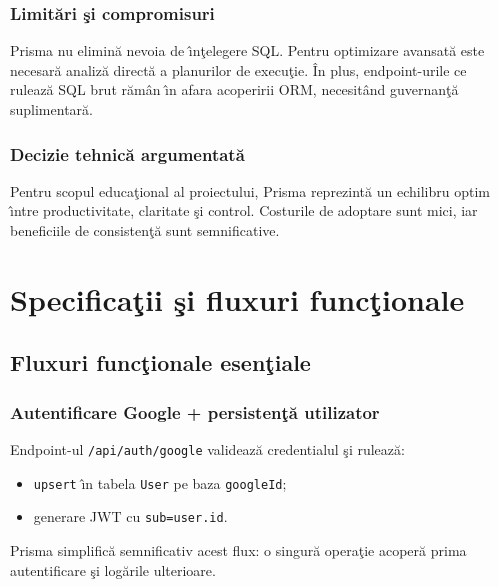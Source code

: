 \documentclass[12pt,onecolumn,draftclsnofoot]{IEEEtran}
\begin{document}
\subsubsection{Limit\u{a}ri \c{s}i compromisuri}
Prisma nu elimin\u{a} nevoia de \^{\i}n\c{t}elegere SQL. Pentru optimizare avansat\u{a} este necesar\u{a} analiz\u{a} direct\u{a} a planurilor de execu\c{t}ie. \^{I}n plus, endpoint-urile ce ruleaz\u{a} SQL brut r\u{a}m\^{a}n \^{\i}n afara acoperirii ORM, necesit\^{a}nd guvernan\c{t}\u{a} suplimentar\u{a}.

\subsubsection{Decizie tehnic\u{a} argumentat\u{a}}
Pentru scopul educa\c{t}ional al proiectului, Prisma reprezint\u{a} un echilibru optim \^{\i}ntre productivitate, claritate \c{s}i control. Costurile de adoptare sunt mici, iar beneficiile de consisten\c{t}\u{a} sunt semnificative.

\newpage
\section{Specifica\c{t}ii \c{s}i fluxuri func\c{t}ionale}

\subsection{Fluxuri func\c{t}ionale esen\c{t}iale}
\subsubsection{Autentificare Google + persisten\c{t}\u{a} utilizator}
Endpoint-ul \texttt{/api/auth/google} valideaz\u{a} credentialul \c{s}i ruleaz\u{a}:
\begin{itemize}
  \item \texttt{upsert} \^{\i}n tabela \texttt{User} pe baza \texttt{googleId};
  \item generare JWT cu \texttt{sub=user.id}.
\end{itemize}
Prisma simplific\u{a} semnificativ acest flux: o singur\u{a} opera\c{t}ie acoper\u{a} prima autentificare \c{s}i log\u{a}rile ulterioare.
\end{document}
